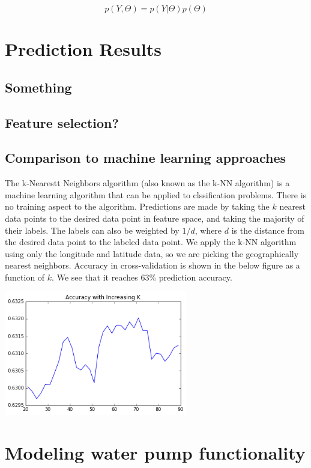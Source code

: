 \documentclass{article} %
\begin{document}
\begin{equation*}
p(Y,\Theta)=p(Y|\Theta)p(\Theta)
\end{equation*}

\section{Prediction Results}

\subsection{Something}
\subsection{Feature selection?}
\subsection{Comparison to machine learning approaches}

The k-Nearestt Neighbors algorithm (also known as the k-NN algorithm) is a machine learning algorithm that can be applied to clssification problems. There is no training aspect to the algorithm. Predictions are made by taking the $k$ nearest data points to the desired data point in feature space, and taking the majority of their labels. The labels can also be weighted by $1/d$, where $d$ is the distance from the desired data point to the labeled data point. We apply the k-NN algorithm using only the longitude and latitude data, so we are picking the geographically nearest neighbors. Accuracy in cross-validation is shown in the below figure as a function of $k$. We see that it reaches 63\% prediction accuracy.

\includegraphics[width=8cm]{figures/kNN_accuracy_vs_K.png}

\section{Modeling water pump functionality}
\end{document}
